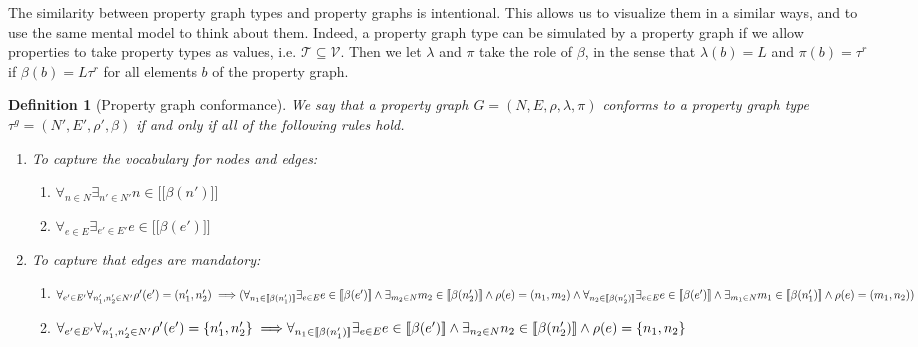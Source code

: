\documentclass[a4paper]{article}
\newtheorem{definition}[theorem]{Definition}
\newcommand{\ptypes}{\mathcal{T}}
\newcommand{\rtype}{\tau^r}
\newcommand{\gtype}{\tau^g}
\newcommand{\lsem}{\ensuremath{[\![}}
\newcommand{\rsem}{\ensuremath{]\!]}}
\newcommand{\sem}[1]{\ensuremath{\lsem #1 \rsem}}
\begin{document}
The similarity between property graph types and property graphs is intentional. This allows us to visualize them in a similar ways, and to use the same mental model to think about them. Indeed, a property graph type can be simulated by a property graph if we allow properties to take property types as values, i.e. $\ptypes \subseteq \mathcal{V}$. Then we let $\lambda$ and $\pi$ take the role of $\beta$, in the sense that $\lambda(b) = L$ and $\pi(b) = \rtype$ if $\beta(b) = L\rtype$ for all elements $b$ of the property graph.

\begin{definition}[Property graph conformance]
  We say that a property graph $G = (N, E, \rho, \lambda, \pi)$ \emph{conforms} to a property graph type $\gtype = (N', E', \rho', \beta)$ if and only if all of the following rules hold.

  \begin{enumerate}
    \item To capture the vocabulary for nodes and edges:
    \begin{enumerate}
      \item $\forall_{n \in N} \exists_{n' \in N'} n \in \sem{\beta(n')}$
      \item $\forall_{e \in E} \exists_{e' \in E'} e \in \sem{\beta(e')}$
    \end{enumerate}
    \item To capture that edges are mandatory:
    \begin{enumerate}
      \item $\forall_{e' \in E'} \forall_{n'_1, n'_2 \in N'} \rho'(e') = (n'_1, n'_2) \implies
      \\\\(\forall_{n_1 \in \sem{\beta(n'_1)}} \exists_{e \in E} e \in \sem{\beta(e')} \wedge \exists_{m_2 \in N} m_2 \in \sem{\beta(n'_2)} \wedge \rho(e) = (n_1, m_2) \wedge
      \\\\ \forall_{n_2 \in \sem{\beta(n'_2)}} \exists_{e \in E} e \in \sem{\beta(e')} \wedge \exists_{m_1 \in N} m_1 \in \sem{\beta(n'_1)} \wedge \rho(e) = (m_1, n_2))$

      \item $\forall_{e' \in E'} \forall_{n'_1, n'_2 \in N'} \rho'(e') = \{n'_1, n'_2\} \implies
      \\\\\forall_{n_1 \in \sem{\beta(n'_1)}} \exists_{e \in E} e \in \sem{\beta(e')} \wedge \exists_{n_2 \in N} n_2 \in \sem{\beta(n'_2)} \wedge \rho(e) = \{n_1, n_2\}$
    \end{enumerate}
  \end{enumerate}
\end{definition}
\end{document}
